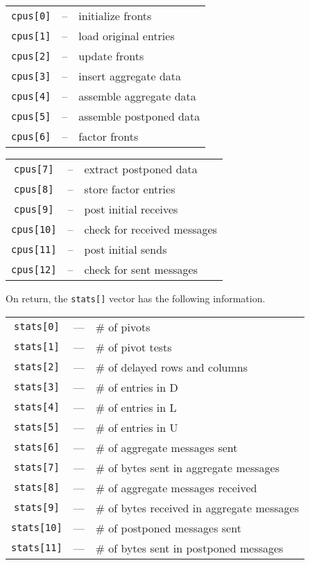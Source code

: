 \begin{enumerate}
\begin{center}
\begin{tabular}{ccl}
{\tt cpus[0]}  & -- & initialize fronts \\
{\tt cpus[1]}  & -- & load original entries \\
{\tt cpus[2]}  & -- & update fronts \\
{\tt cpus[3]}  & -- & insert aggregate data \\
{\tt cpus[4]}  & -- & assemble aggregate data \\
{\tt cpus[5]}  & -- & assemble postponed data \\
{\tt cpus[6]}  & -- & factor fronts
\end{tabular}
\begin{tabular}{ccl}
{\tt cpus[7]}  & -- & extract postponed data \\
{\tt cpus[8]}  & -- & store factor entries \\
{\tt cpus[9]}  & -- & post initial receives \\
{\tt cpus[10]} & -- & check for received messages \\
{\tt cpus[11]} & -- & post initial sends \\
{\tt cpus[12]} & -- & check for sent messages
\end{tabular}
\end{center}
On return, the {\tt stats[]} vector has the following information.
\begin{center}
\begin{tabular}{ccl}
{\tt stats[0]} & --- & \# of pivots \\
{\tt stats[1]} & --- & \# of pivot tests \\
{\tt stats[2]} & --- & \# of delayed rows and columns \\
{\tt stats[3]} & --- & \# of entries in D \\
{\tt stats[4]} & --- & \# of entries in L \\
{\tt stats[5]} & --- & \# of entries in U \\
{\tt stats[6]} & --- & \# of aggregate messages sent \\
{\tt stats[7]} & --- & \# of bytes sent in aggregate messages \\
{\tt stats[8]} & --- & \# of aggregate messages received \\
{\tt stats[9]} & --- & \# of bytes received in aggregate messages \\
{\tt stats[10]} & --- & \# of postponed messages sent \\
{\tt stats[11]} & --- & \# of bytes sent in postponed messages \\

\end{tabular}
\end{center}
\end{enumerate}
